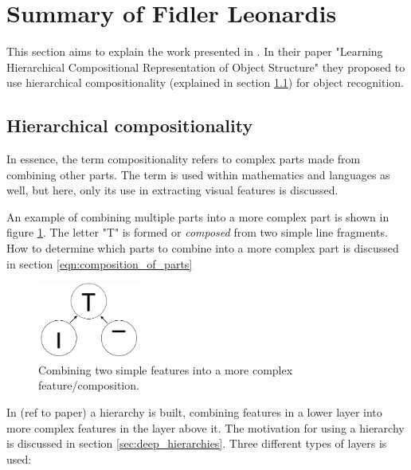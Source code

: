 \section{Summary of Fidler Leonardis }
\label{sec:fidler}
This section aims to explain the work presented in \cite{fidler2009learning}. 
In their paper "Learning Hierarchical Compositional Representation of Object Structure" they proposed to use hierarchical compositionality (explained in section \ref{sec:hierarchical-comp}) for object recognition. 

\subsection{Hierarchical compositionality}
\label{sec:hierarchical-comp}
In essence, the term compositionality refers to complex parts made from combining other parts. \cite[p. 2]{fidler2007towards}
The term is used within mathematics and languages as well, but here, only its use in extracting visual features is discussed. 

An example of combining multiple parts into a more complex part is shown in figure \ref{fig:compositionality1}. 
The letter "T" is formed or \textit{composed} from two simple line fragments. 
How to determine which parts to combine into a more complex part is discussed in section \ref{eqn:composition_of_parts}

\begin{figure}[h!] %
\centering
\includegraphics[width=0.3\textwidth]{graphics/compositionality1}
\caption{Combining two simple features into a more complex feature/composition.}
\label{fig:compositionality1}
\end{figure}

In (ref to paper) a hierarchy is built, combining features in a lower layer into more complex features in the layer above it. 
The motivation for using a hierarchy is discussed in section \ref{sec:deep_hierarchies}. 
Three different types of layers is used: 

